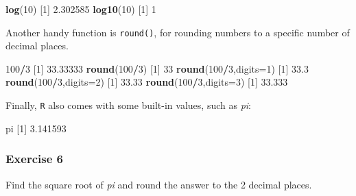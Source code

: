 \documentclass[
]{book}
\newenvironment{Shaded}{\begin{snugshade}}{\end{snugshade}}
\newcommand{\DataTypeTok}[1]{\textcolor[rgb]{0.13,0.29,0.53}{#1}}
\newcommand{\DecValTok}[1]{\textcolor[rgb]{0.00,0.00,0.81}{#1}}
\newcommand{\FloatTok}[1]{\textcolor[rgb]{0.00,0.00,0.81}{#1}}
\newcommand{\KeywordTok}[1]{\textcolor[rgb]{0.13,0.29,0.53}{\textbf{#1}}}
\newcommand{\NormalTok}[1]{#1}
\newcommand{\OperatorTok}[1]{\textcolor[rgb]{0.81,0.36,0.00}{\textbf{#1}}}
\begin{document}
\begin{Shaded}
\begin{Highlighting}[]
\KeywordTok{log}\NormalTok{(}\DecValTok{10}\NormalTok{)}
\NormalTok{[}\DecValTok{1}\NormalTok{] }\FloatTok{2.302585}
\KeywordTok{log10}\NormalTok{(}\DecValTok{10}\NormalTok{)}
\NormalTok{[}\DecValTok{1}\NormalTok{] }\DecValTok{1}
\end{Highlighting}
\end{Shaded}

Another handy function is \texttt{round()}, for rounding numbers to a specific number of decimal places.

\begin{Shaded}
\begin{Highlighting}[]
\DecValTok{100}\OperatorTok{/}\DecValTok{3}
\NormalTok{[}\DecValTok{1}\NormalTok{] }\FloatTok{33.33333}
\KeywordTok{round}\NormalTok{(}\DecValTok{100}\OperatorTok{/}\DecValTok{3}\NormalTok{)}
\NormalTok{[}\DecValTok{1}\NormalTok{] }\DecValTok{33}
\KeywordTok{round}\NormalTok{(}\DecValTok{100}\OperatorTok{/}\DecValTok{3}\NormalTok{,}\DataTypeTok{digits=}\DecValTok{1}\NormalTok{)}
\NormalTok{[}\DecValTok{1}\NormalTok{] }\FloatTok{33.3}
\KeywordTok{round}\NormalTok{(}\DecValTok{100}\OperatorTok{/}\DecValTok{3}\NormalTok{,}\DataTypeTok{digits=}\DecValTok{2}\NormalTok{)}
\NormalTok{[}\DecValTok{1}\NormalTok{] }\FloatTok{33.33}
\KeywordTok{round}\NormalTok{(}\DecValTok{100}\OperatorTok{/}\DecValTok{3}\NormalTok{,}\DataTypeTok{digits=}\DecValTok{3}\NormalTok{)}
\NormalTok{[}\DecValTok{1}\NormalTok{] }\FloatTok{33.333}
\end{Highlighting}
\end{Shaded}

Finally, \texttt{R} also comes with some built-in values, such as \emph{pi}:

\begin{Shaded}
\begin{Highlighting}[]
\NormalTok{pi}
\NormalTok{[}\DecValTok{1}\NormalTok{] }\FloatTok{3.141593}
\end{Highlighting}
\end{Shaded}

\hypertarget{exercise-6}{%
\subsubsection*{Exercise 6}\label{exercise-6}}

Find the square root of \emph{pi} and round the answer to the 2 decimal places.
\end{document}
